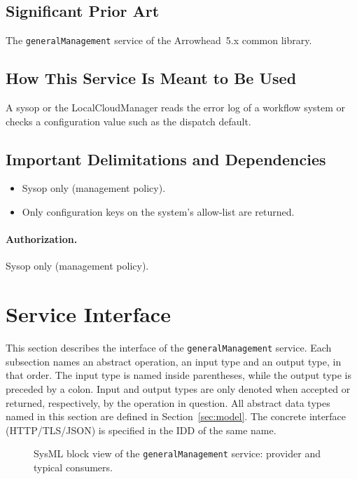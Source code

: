 \documentclass[a4paper]{arrowhead}
\begin{document}
\subsection{Significant Prior Art}
The \texttt{general\allowbreak{}Management} service of the Arrowhead~5.x common library.

\subsection{How This Service Is Meant to Be Used}
A sysop or the LocalCloudManager reads the error log of a workflow system or checks a configuration value
such as the dispatch default.

\subsection{Important Delimitations and Dependencies}
\label{sec:delimitations}
\begin{itemize}
\item Sysop only (management policy).
\item Only configuration keys on the system's allow-list are returned.
\end{itemize}

\paragraph{Authorization.} Sysop only (management policy).

\newpage
\section{Service Interface}
\label{sec:operations}
This section describes the interface of the \texttt{general\allowbreak{}Management} service. Each subsection names an abstract operation,
an input type and an output type, in that order. The input type is named inside parentheses, while the output type is
preceded by a colon. Input and output types are only denoted when accepted or returned, respectively, by the operation
in question. All abstract data types named in this section are defined in Section~\ref{sec:model}. The concrete
interface (HTTP/TLS/JSON) is specified in the IDD of the same name.

\begin{figure}[ht!]
  \centering
  \caption{SysML block view of the \texttt{generalManagement} service: provider and typical consumers.}
  \label{fig:SD}
\end{figure}
\end{document}
